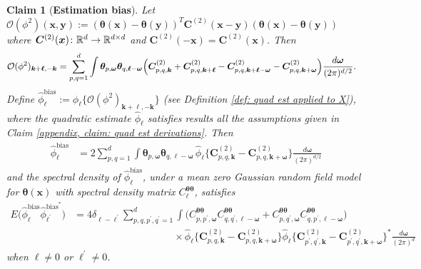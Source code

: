 \documentclass[10pt,noinfoline]{imsart}
\newtheorem{claim}{Claim}
\newcommand{\bs}{\boldsymbol}
\begin{document}
%
%

\begin{claim}[{\bf Estimation bias}]\label{thm: bias in the appendix}
    Let $\mathcal O(\phi^2)(\bs x,\bs y) := {(\bs\theta(\bs x)-\bs\theta(\bs y))}^T \bs C^{(2)}(\bs x-\bs y) (\bs\theta(\bs x)-\bs\theta(\bs y))$ where $\bs C^{(2)}(\bs x)\colon\Bbb R^d \rightarrow \Bbb R^{d\times d}$ and $\bs C^{(2)}(-\bs x)=\bs C^{(2)}(\bs x)$. Then
    \begin{align}
    	\label{eq: the form of Op2}
        \mathcal O(\phi^2)_{\bs k+\bs\ell, -\bs k}
        &=\sum_{p,q = 1}^d
        \int \bs\theta_{p,\bs\omega}\bs\theta_{q,\bs\ell - \bs\omega}
		 \Bigl(
         {\bs C^{(2)}_{p,q,\bs k}}
        + {\bs C^{(2)}_{p,q,\bs k +\bs \ell}}
        - {\bs C^{(2)}_{p,q,\bs k +\bs \ell - \bs\omega}}
        - {\bs C^{(2)}_{p,q,\bs k + \bs\omega}}
        \Bigr)\frac{d\bs\omega}{(2\pi)^{d/2}}.
    \end{align}
    Define $\hat\phi_{\bs \ell}^{\text{bias}}:=\hat\phi_{\bs \ell}\big\{\mathcal O(\phi^2)_{\bs k+\bs \ell, -\bs k}\big\}$ (see Definition \ref{def: quad est applied to X}), where the quadratic estimate $\hat\phi_{\bs \ell}$ satisfies results all the assumptions given in Claim \ref{appendix, claim: quad est derivations}. Then 
    \begin{align}
    	\label{eq: the form of hatphibias}
        \hat\phi_{\bs \ell}^{\text{bias}}&= 2\sum_{p,q=1}^d
    	\int 
    	\bs\theta_{p,\bs\omega}\bs\theta_{q,\bs \ell - \bs\omega}\, \hat\phi_{\bs \ell}\Big\{{\bs C^{(2)}_{p,q,\bs k}}- {\bs C^{(2)}_{p,q,\bs k + \bs\omega}}\Big\}\frac{d\bs\omega}{(2\pi)^{d/2}}
   	\end{align}
    and the spectral density of $\hat\phi_{\bs \ell}^{\text{bias}}$, under a mean zero Gaussian random field model for $\bs\theta(\bs x)$ with spectral density matrix $C_{\bs \ell}^{\bs \theta\bs\theta}$, satisfies
	\begin{align}
    	\label{eq: the form of the spectrum for hatphibias}
		E\big(\hat\phi_{\bs \ell}^{\text{bias}} \hat\phi_{\bs \ell^\prime}^{\text{bias}^*}\big)
        &=
        4\delta_{\bs\ell-\bs \ell^\prime}\!\!\! \sum_{p,q,p^\prime,q^\prime=1}^d \int 
        \Big(
        C^{\bs \theta\bs \theta}_{p,p^\prime,\bs \omega}C^{\bs \theta\bs \theta}_{q,q^\prime,\bs \ell - \bs \omega}
        + C^{\bs \theta\bs \theta}_{p,q^\prime,\bs \omega}C^{\bs \theta\bs \theta}_{q,p^\prime,\bs \ell - \bs \omega}
        \Big)\nonumber
    	\\
        &\qquad\qquad\qquad\qquad\qquad\times
        \hat\phi_{\bs \ell}\Big\{{\bs C^{(2)}_{p,q,\bs k}}- {\bs C^{(2)}_{p,q,\bs k + \bs\omega}}\Big\}
        \hat\phi_{\bs \ell}\Big\{{\bs C^{(2)}_{p^\prime,q^\prime,\bs k}}- {\bs C^{(2)}_{p^\prime,q^\prime,\bs k + \bs\omega}}\Big\}^*\frac{d\bs\omega}{(2\pi)^{d}}
        \end{align}
        when $\bs \ell \neq 0$ or $\bs \ell^\prime \neq 0$.
\end{claim}
\end{document}
